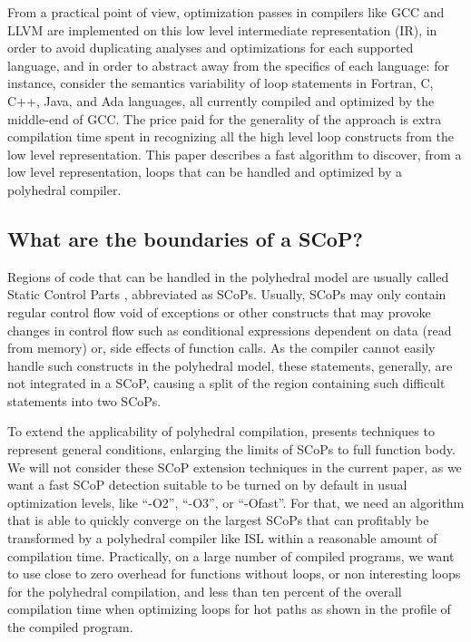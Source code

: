 \documentclass{sig-alternate}
\begin{document}
From a practical point of view, optimization passes in compilers like GCC and
LLVM are implemented on this low level intermediate representation (IR), in
order to avoid duplicating analyses and optimizations for each supported
language, and in order to abstract away from the specifics of each language: for
instance, consider the semantics variability of loop statements in Fortran, C,
C++, Java, and Ada languages, all currently compiled and optimized by the
middle-end of GCC.  The price paid for the generality of the approach is extra
compilation time spent in recognizing all the high level loop constructs from
the low level representation.  This paper describes a fast algorithm to
discover, from a low level representation, loops that can be handled and
optimized by a polyhedral compiler.

\subsection{What are the boundaries of a SCoP?}

Regions of code that can be handled in the polyhedral model are usually called
Static Control Parts \cite{Girbal,Bondhugula}, abbreviated as SCoPs.  Usually, SCoPs
may only contain regular control flow void of exceptions or other constructs
that may provoke changes in control flow such as conditional expressions
dependent on data (read from memory) or, side effects of function calls.  As the
compiler cannot easily handle such constructs in the polyhedral model, these
statements, generally, are not integrated in a SCoP, causing a split of the
region containing such difficult statements into two SCoPs.

To extend the applicability of polyhedral compilation, \cite{scopExtend}
presents techniques to represent general conditions, enlarging the limits of
SCoPs to full function body.  We will not consider these SCoP extension
techniques in the current paper, as we want a fast SCoP detection suitable to be
turned on by default in usual optimization levels, like ``-O2'', ``-O3'', or
``-Ofast''.  For that, we need an algorithm that is able to quickly converge on
the largest SCoPs that can profitably be transformed by a polyhedral compiler
like ISL \cite{verdoolaege2010isl} within a reasonable amount of compilation time.
Practically, on a large number of compiled programs, we want to use close to
zero overhead for functions without loops, or non interesting loops for the
polyhedral compilation, and less than ten percent of the overall compilation
time when optimizing loops for hot paths as shown in the profile of the compiled
program.
\end{document}
